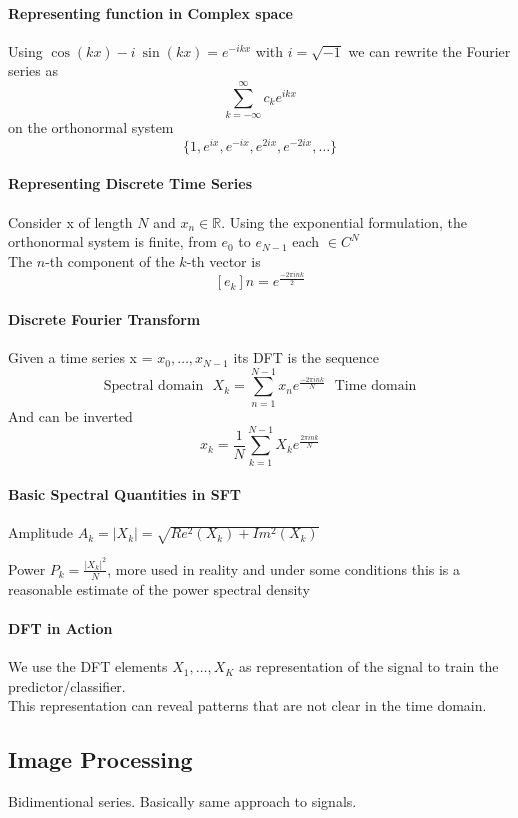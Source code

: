 \documentclass[10pt]{report}
\begin{document}
\paragraph{Representing function in Complex space} Using $\cos(kx)-i\:\sin(kx) = e^{-ikx}$ with $i=\sqrt{-1}$ we can rewrite the Fourier series as $$\sum_{k=-\infty}^\infty c_k e^{ikx}$$
on the orthonormal system $$\{1,e^{ix},e^{-ix},e^{2ix},e^{-2ix},\ldots\}$$
\paragraph{Representing Discrete Time Series} Consider x of length $N$ and $x_n\in \mathbb{R}$. Using the exponential formulation, the orthonormal system is finite, from $e_0$ to $e_{N-1}$ each $\in C^N$\\
The $n$-th component of the $k$-th vector is $$[e_k]n=e^{\frac{-2\pi ink}{2}}$$
\paragraph{Discrete Fourier Transform} Given a time series x = $x_0,\ldots,x_{N-1}$ its DFT is the sequence $$\text{Spectral domain}\:\:\:X_k = \sum_{n=1}^{N-1}x_ne^{\frac{-2\pi ink}{N}}\:\:\:\text{Time domain}$$
And can be inverted $$x_k = \frac{1}{N}\sum_{k=1}^{N-1}X_ke^{\frac{2\pi ink}{N}}$$
\paragraph{Basic Spectral Quantities in SFT}
\begin{list}{}{}
	\item Amplitude $A_k = |X_k| = \sqrt{Re^2(X_k)+Im^2(X_k)}$
	\item Power $P_k = \frac{|X_k|^2}{N}$, more used in reality and under some conditions this is a reasonable estimate of the power spectral density
\end{list}
\paragraph{DFT in Action} We use the DFT elements $X_1,\ldots,X_K$ as representation of the signal to train the predictor/classifier.\\
This representation can reveal patterns that are not clear in the time domain.
\subsection{Image Processing}
Bidimentional series. Basically same approach to signals.
\end{document}
